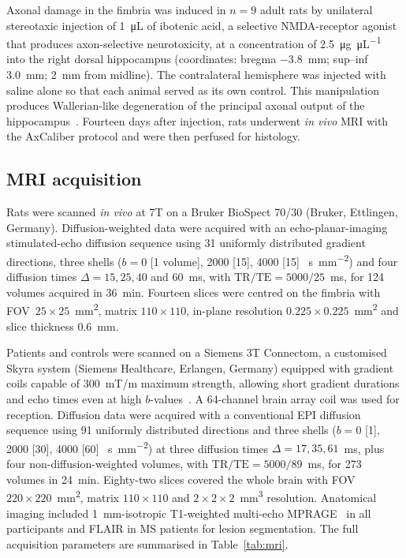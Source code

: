 \documentclass[11pt]{article}
\begin{document}
Axonal damage in the fimbria was induced in $n=9$ adult rats by unilateral stereotaxic injection of \SI{1}{\micro\liter} of ibotenic acid, a selective NMDA-receptor agonist that produces axon-selective neurotoxicity, at a concentration of \SI{2.5}{\micro\gram\per\micro\liter} into the right dorsal hippocampus (coordinates: bregma $-3.8$~mm; sup--inf \SI{3.0}{mm}; \SI{2}{mm} from midline). The contralateral hemisphere was injected with saline alone so that each animal served as its own control. This manipulation produces Wallerian-like degeneration of the principal axonal output of the hippocampus~\cite{conforti2014wallerian}. Fourteen days after injection, rats underwent \emph{in vivo} MRI with the AxCaliber protocol and were then perfused for histology.

\subsection{MRI acquisition}
Rats were scanned \emph{in vivo} at 7T on a Bruker BioSpect 70/30 (Bruker, Ettlingen, Germany). Diffusion-weighted data were acquired with an echo-planar-imaging stimulated-echo diffusion sequence using 31 uniformly distributed gradient directions, three shells ($b=0$ [1 volume], 2000 [15], 4000 [15] \SI{}{\second\per\square\milli\meter}) and four diffusion times $\Delta = 15, 25, 40$ and $60$~ms, with $\mathrm{TR}/\mathrm{TE} = 5000/25$~ms, for 124 volumes acquired in 36~min. Fourteen slices were centred on the fimbria with FOV~$25\times25$~mm\textsuperscript{2}, matrix $110\times110$, in-plane resolution $0.225\times0.225$~mm\textsuperscript{2} and slice thickness \SI{0.6}{mm}.

Patients and controls were scanned on a Siemens 3T Connectom, a customised Skyra system (Siemens Healthcare, Erlangen, Germany) equipped with gradient coils capable of \SI{300}{mT/m} maximum strength, allowing short gradient durations and echo times even at high $b$-values~\cite{jones2018microstructural}. A 64-channel brain array coil was used for reception. Diffusion data were acquired with a conventional EPI diffusion sequence using 91 uniformly distributed directions and three shells ($b=0$ [1], 2000 [30], 4000 [60] \SI{}{\second\per\square\milli\meter}) at three diffusion times $\Delta = 17, 35, 61$~ms, plus four non-diffusion-weighted volumes, with $\mathrm{TR}/\mathrm{TE}=5000/89$~ms, for 273 volumes in 24~min. Eighty-two slices covered the whole brain with FOV~$220\times220$~mm\textsuperscript{2}, matrix $110\times110$ and $2\times2\times2$~mm\textsuperscript{3} resolution. Anatomical imaging included \SI{1}{mm}-isotropic T1-weighted multi-echo MPRAGE~\cite{fujimoto2014quantitative} in all participants and FLAIR in MS patients for lesion segmentation. The full acquisition parameters are summarised in Table~\ref{tab:mri}.
\end{document}

